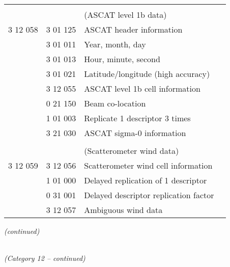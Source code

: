 \begin{longtable}[]{@{}llll@{}}
& & &\tabularnewline
& & (ASCAT level 1b data) &\tabularnewline
3 12 058 & 3 01 125 & ASCAT header information &\tabularnewline
& 3 01 011 & Year, month, day &\tabularnewline
& 3 01 013 & Hour, minute, second &\tabularnewline
& 3 01 021 & Latitude/longitude (high accuracy) &\tabularnewline
& 3 12 055 & ASCAT level 1b cell information &\tabularnewline
& 0 21 150 & Beam co-location &\tabularnewline
& 1 01 003 & Replicate 1 descriptor 3 times &\tabularnewline
& 3 21 030 & ASCAT sigma-0 information &\tabularnewline
& & &\tabularnewline
& & (Scatterometer wind data) &\tabularnewline
3 12 059 & 3 12 056 & Scatterometer wind cell information &\tabularnewline
& 1 01 000 & Delayed replication of 1 descriptor &\tabularnewline
& 0 31 001 & Delayed descriptor replication factor &\tabularnewline
& 3 12 057 & Ambiguous wind data &\tabularnewline
\bottomrule
\end{longtable}

\emph{(continued)}

\emph{\\
(Category 12 -- continued)}

